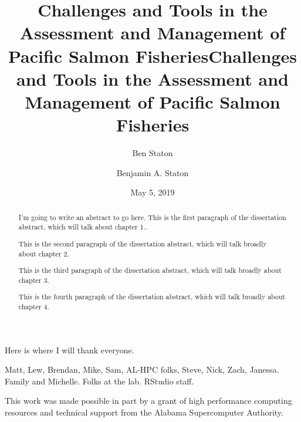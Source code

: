 \documentclass[12pt,]{book}
\title{Challenges and Tools in the Assessment and Management of Pacific Salmon
Fisheries}
\author{Ben Staton}
\date{}
\title{Challenges and Tools in the Assessment and Management of Pacific Salmon Fisheries}
\author{Benjamin A. Staton}
\date{May 5, 2019} %
\theoremstyle{definition}
\theoremstyle{definition}
\theoremstyle{definition}
\theoremstyle{remark}
\begin{document}
\maketitle

\begin{romanpages}      %

\TitlePage 

\doublespacing
\setlength{\parskip}{0pt plus 0pt minus 0pt}

\begin{abstract} 
\noindent
I'm going to write an abstract to go here. This is the first paragraph of the dissertation abstract, which will talk about chapter 1..

This is the second paragraph of the dissertation abstract, which will talk broadly about chapter 2.

This is the third paragraph of the dissertation abstract, which will talk broadly about chapter 3.

This is the fourth paragraph of the dissertation abstract, which will talk broadly about chapter 4.
\end{abstract}

\begin{acknowledgments}
\noindent
Here is where I will thank everyone.

Matt, Lew, Brendan, Mike, Sam, AL-HPC folks, Steve, Nick, Zach, Janessa. Family and Michelle. Folks at the lab. RStudio staff.

This work was made possible in part by a grant of high performance computing resources and technical support from the Alabama Supercomputer Authority.
\end{acknowledgments}

\begin{singlespace}
	\tableofcontents
	\clearpage
	\listoffigures
	\clearpage
	\listoftables
\end{singlespace}

\end{romanpages}        %

\normalem       %

\end{document}
